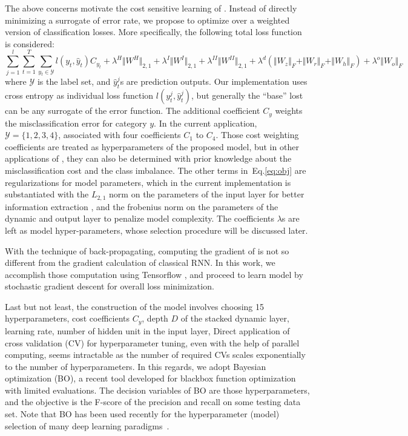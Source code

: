 The above concerns motivate the cost sensitive learning of \modelname.
Instead of directly minimizing a surrogate of error rate, we propose to optimize over a weighted version of classification losses.
More specifically, the following total loss function is considered:
\begin{equation}
\label{eq:obj}
\sum_{j=1}^l\sum_{t=1}^T \sum_{y_t \in \mathcal{Y}} l(y_t,\hat{y}_t)C_{y_t} + \lambda^H \Vert W^H\Vert_{2,1} + \lambda^I \Vert W^I\Vert_{2,1} + \lambda^{II} \Vert W^{II}\Vert_{2,1} + \lambda^d (\Vert W_z\Vert_{F}+\Vert W_r\Vert_F+\Vert W_h\Vert_F) +\lambda^o \Vert W_o\Vert_F
\end{equation}
where $\mathcal{Y}$ is the label set, and $\hat{y}_t^j$s are prediction outputs.
Our implementation uses cross entropy as individual loss function $l(y_t^j,\hat{y}_t^j)$, but generally the ``base'' lost can be any surrogate of the error function.
The additional coefficient $C_{y}$ weights the misclassification error for category $y$.
In the current application, $\mathcal{Y} = \{1,2,3,4\}$, associated with four coefficients $C_1$ to $C_4$.
Those cost weighting coefficients are treated as hyperparameters of the proposed model, but in other applications of \modelname, they can also be determined with prior knowledge about the misclassification cost and the class imbalance. The other terms in~Eq.\ref{eq:obj} are regularizations for model parameters, which in the current implementation is substantiated with the $L_{2,1}$ norm on the parameters of the input layer for better information extraction \cite{nie2010efficient}, and the frobenius norm on the parameters of the dynamic and output layer to penalize model complexity. The coefficients $\lambda$s are left as model hyper-parameters, whose selection procedure will be discussed later.

With the technique of back-propagating, computing the gradient of \modelname is not so different from the gradient calculation of classical RNN.
In this work, we accomplish those computation using Tensorflow \cite{bib:Tensorflow}, and proceed to learn \modelname model by stochastic gradient descent for overall loss minimization.

Last but not least, the construction of the \modelname model involves choosing 15 hyperparameters, \eg cost coefficients $C_{y}$, depth $D$ of the stacked dynamic layer, learning rate, number of hidden unit in the input layer, \etc
Direct application of cross validation (CV) for hyperparameter tuning, even with the help of parallel computing, seems intractable as the number of required CVs scales exponentially to the number of hyperparameters.
In this regards, we adopt Bayesian optimization (BO), a recent tool developed for blackbox function optimization with limited evaluations.
The decision variables of BO are those hyperparameters, and the objective is the F-score of the precision and recall on some testing data set.
Note that BO has been used recently for the hyperparameter (model) selection of many deep learning paradigms~\cite{snoek2012practical}.



